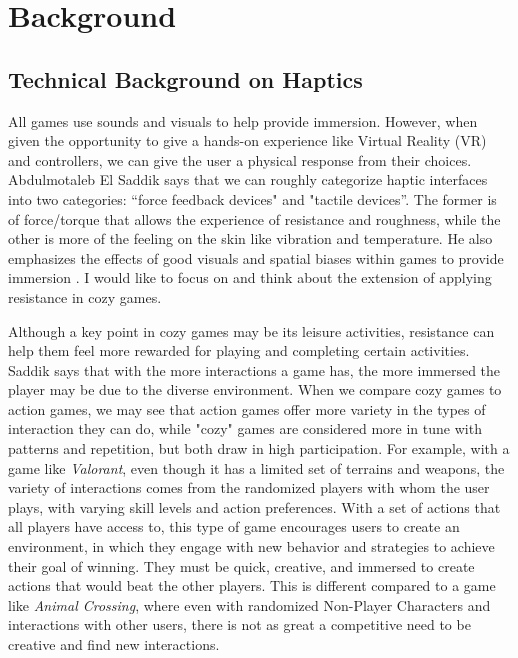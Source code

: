 \documentclass[10pt,twocolumn]{article}
\begin{document}
\section{Background}

\subsection{Technical Background on Haptics}

All games use sounds and visuals to help provide immersion. However, when given the opportunity to give a hands-on experience like Virtual Reality (VR) and controllers, we can give the user a physical response from their choices. Abdulmotaleb El Saddik says that we can roughly categorize haptic interfaces into two categories: “force feedback devices" and "tactile devices”. The former is of force/torque that allows the experience of resistance and roughness, while the other is more of the feeling on the skin like vibration and temperature. He also emphasizes the effects of good visuals and spatial biases within games to provide immersion \cite{saddik_haptics_2012}. I would like to focus on and think about the extension of applying resistance in cozy games. 

Although a key point in cozy games may be its leisure activities, resistance can help them feel more rewarded for playing and completing certain activities. Saddik says that with the more interactions a game has, the more immersed the player may be due to the diverse environment. When we compare cozy games to action games, we may see that action games offer more variety in the types of interaction they can do, while "cozy" games are considered more in tune with patterns and repetition, but both draw in high participation. For example, with a game like \textit{Valorant}\cite{valorant2020}, even though it has a limited set of terrains and weapons, the variety of interactions comes from the randomized players with whom the user plays, with varying skill levels and action preferences. With a set of actions that all players have access to, this type of game  encourages users to create an environment, in which they engage with new behavior and strategies to achieve their goal of winning. They must be quick, creative, and immersed to create actions that would beat the other players. This is different compared to a game like \textit{Animal Crossing}\cite{animalcrossing2020}, where even with randomized Non-Player Characters and interactions with other users, there is not as great a competitive need to be creative and find new interactions.
\end{document}
